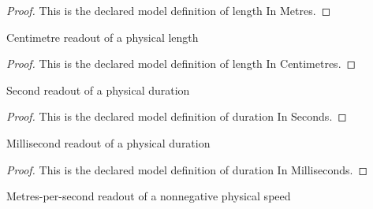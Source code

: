 \begin{proof}
  This is the declared model definition of length In Metres.
\end{proof}
\begin{definition}
  \label{def:physics:phyx-mini-0753:phyxminiproblems-problemphyxmini0753-lengthincentimetres}
  Centimetre readout of a physical length
\end{definition}
\begin{proof}
  This is the declared model definition of length In Centimetres.
\end{proof}
\begin{definition}
  \label{def:physics:phyx-mini-0753:phyxminiproblems-problemphyxmini0753-durationinseconds}
  Second readout of a physical duration
\end{definition}
\begin{proof}
  This is the declared model definition of duration In Seconds.
\end{proof}
\begin{definition}
  \label{def:physics:phyx-mini-0753:phyxminiproblems-problemphyxmini0753-durationinmilliseconds}
  Millisecond readout of a physical duration
\end{definition}
\begin{proof}
  This is the declared model definition of duration In Milliseconds.
\end{proof}
\begin{definition}
  \label{def:physics:phyx-mini-0753:phyxminiproblems-problemphyxmini0753-speedinmetrespersecond}
  Metres-per-second readout of a nonnegative physical speed
\end{definition}
